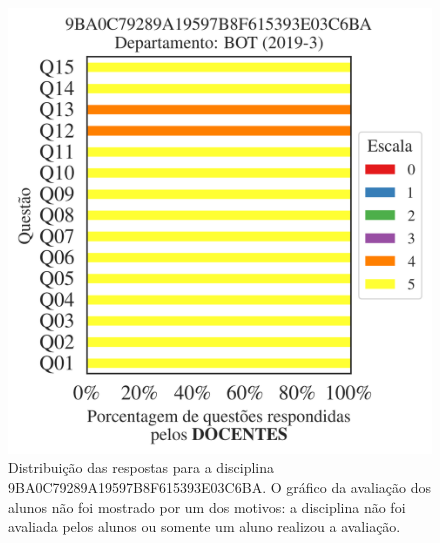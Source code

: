 \documentclass[a4paper,10pt]{article}
\begin{document}
\begin{figure}[h]
\centering
\includegraphics[width=0.485\linewidth]{analise_disciplina_departamento_BOT_9BA0C79289A19597B8F615393E03C6BA_docentes.png}
\caption{\label{fig:analise_geral_departamento}                Distribuição das respostas para a disciplina 9BA0C79289A19597B8F615393E03C6BA. O gráfico da avaliação dos alunos não foi mostrado  por um dos motivos:  a disciplina não foi avaliada pelos alunos ou somente um aluno realizou a avaliação. }
\end{figure}
\end{document}
